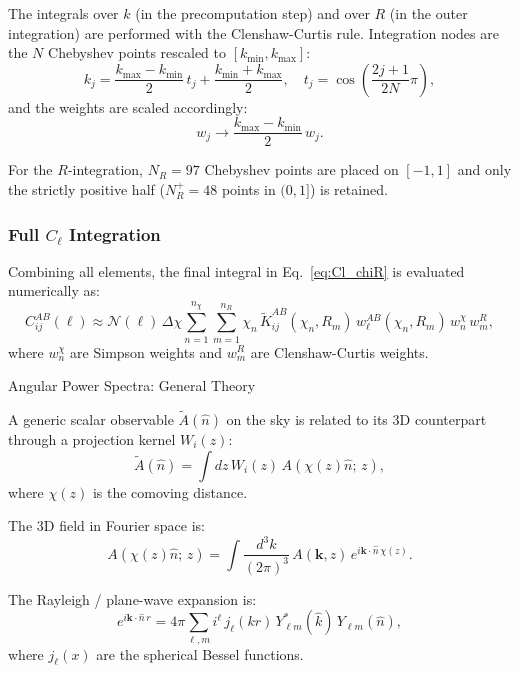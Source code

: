 The integrals over $k$ (in the precomputation step) and over $R$ (in the
outer integration) are performed with the Clenshaw-Curtis rule. Integration
nodes are the $N$ Chebyshev points rescaled to $[k_{\min}, k_{\max}]$:
\begin{equation}
    k_j = \frac{k_{\max}-k_{\min}}{2}\,t_j + \frac{k_{\min}+k_{\max}}{2},
    \quad t_j = \cos\!\left(\frac{2j+1}{2N}\pi\right),
\end{equation}
and the weights are scaled accordingly:
\begin{equation}
    w_j \to \frac{k_{\max}-k_{\min}}{2}\,w_j.
\end{equation}

For the $R$-integration, $N_R = 97$ Chebyshev points are placed on $[-1,1]$
and only the strictly positive half ($N_R^+ = 48$ points in $(0,1]$) is
retained.

\subsubsection{Full $C_\ell$ Integration}

Combining all elements, the final integral in Eq.~\eqref{eq:Cl_chiR} is
evaluated numerically as:
\begin{equation}
    C^{AB}_{ij}(\ell) \approx
    \mathcal{N}(\ell)\,\Delta\chi
    \sum_{n=1}^{n_\chi} \sum_{m=1}^{n_R}
    \chi_n\,\tilde{K}^{AB}_{ij}(\chi_n, R_m)\,
    w^{AB}_\ell(\chi_n, R_m)\,
    w^\chi_n\,w^R_m,
    \label{eq:Cl_numerical}
\end{equation}
where $w^\chi_n$ are Simpson weights and $w^R_m$ are Clenshaw-Curtis weights.

{Angular Power Spectra: General Theory}

A generic scalar observable $\tilde{A}(\hat{n})$ on the sky is related to its 3D
counterpart through a projection kernel $W_i(z)$:
\begin{equation}
    \tilde{A}(\hat{n}) = \int dz\, W_i(z)\, A(\chi(z)\hat{n};\, z),
    \label{eq:projection}
\end{equation}
where $\chi(z)$ is the comoving distance.

The 3D field in Fourier space is:
\begin{equation}
    A(\chi(z)\hat{n};\,z) = \int \frac{d^3k}{(2\pi)^3}\, A(\mathbf{k},z)\,
    e^{i\mathbf{k}\cdot\hat{n}\,\chi(z)}.
\end{equation}

The Rayleigh / plane-wave expansion is:
\begin{equation}
    e^{i\mathbf{k}\cdot\hat{n}\,r} = 4\pi \sum_{\ell,m} i^\ell\,
    j_\ell(kr)\,Y^*_{\ell m}(\hat{k})\,Y_{\ell m}(\hat{n}),
\end{equation}
where $j_\ell(x)$ are the spherical Bessel functions.

